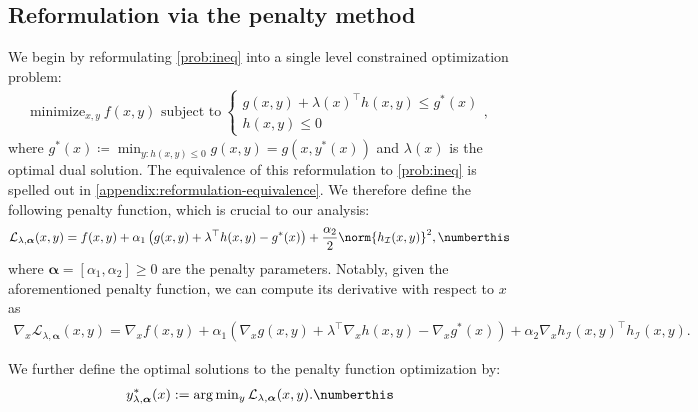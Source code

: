\subsection{Reformulation via the penalty method}
We begin by reformulating \cref{prob:ineq} into a single level constrained optimization problem:
\begin{align}\label{eqn:inequality_reformulation}
    \text{minimize}_{x,y} ~ f(x,y)  \text{ subject to}
    ~\begin{cases}
        g(x,y) + \lambda(x)^\top h(x,y) \leq g^*(x) \\ 
        h(x,y) \leq 0
    \end{cases},
\end{align}
where $g^*(x)  \coloneqq \min_{y: h(x,y) \leq 0} g(x,y) = g(x,y^*(x))$ and $\lambda(x)$ is the optimal dual solution. The equivalence of this reformulation to  \cref{prob:ineq} is spelled out in \cref{appendix:reformulation-equivalence}. 
We therefore define the following penalty function, which is crucial to our analysis:
\begin{align}
    \mathcal{L}_{\lambda, \boldsymbol{\alpha}}(x,y) = f(x,y) + \alpha_1 \left( g(x,y) + \lambda^\top h(x,y) - g^*(x)  \right) + \frac{\alpha_2}{2} \norm{h_\mathcal{I}(x,y)}^2, \numberthis\label{eqn:penalty-lagrangian}
\end{align}
where $\boldsymbol{\alpha} = [\alpha_1, \alpha_2] \geq 0$ are the penalty parameters.
Notably, given the aforementioned penalty function, we can compute its derivative with respect to $x$ as
\begin{align*}
    \nabla_x \mathcal{L}_{\lambda, \boldsymbol{\alpha}}(x, y) = \nabla_x f(x,y) \! + \! \alpha_1 (\nabla_x g(x,y) \! + \! \lambda^\top \nabla_x h(x,y) \! - \! \nabla_x g^*(x) ) \! + \! \alpha_2 \nabla_x h_\mathcal{I}(x,y)^\top h_\mathcal{I}(x,y).
\end{align*}

We further define the optimal solutions to the penalty function optimization by:
\begin{align*}
    y_{\lambda, \boldsymbol{\alpha}}^*(x) := \arg\min\nolimits_{y} \mathcal{L}_{\lambda, \boldsymbol{\alpha}}(x,y).\numberthis\label{eq:def_y_lambda_star} 
\end{align*}



